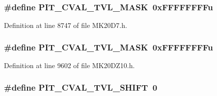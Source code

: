 \subsubsection[{\texorpdfstring{P\+I\+T\+\_\+\+C\+V\+A\+L\+\_\+\+T\+V\+L\+\_\+\+M\+A\+SK}{PIT_CVAL_TVL_MASK}}]{\setlength{\rightskip}{0pt plus 5cm}\#define P\+I\+T\+\_\+\+C\+V\+A\+L\+\_\+\+T\+V\+L\+\_\+\+M\+A\+SK~0x\+F\+F\+F\+F\+F\+F\+F\+Fu}\hypertarget{group___p_i_t___register___masks_ga2810b877338372cb9b9d944b206c08d3}{}\label{group___p_i_t___register___masks_ga2810b877338372cb9b9d944b206c08d3}


Definition at line 8747 of file M\+K20\+D7.\+h.

\subsubsection[{\texorpdfstring{P\+I\+T\+\_\+\+C\+V\+A\+L\+\_\+\+T\+V\+L\+\_\+\+M\+A\+SK}{PIT_CVAL_TVL_MASK}}]{\setlength{\rightskip}{0pt plus 5cm}\#define P\+I\+T\+\_\+\+C\+V\+A\+L\+\_\+\+T\+V\+L\+\_\+\+M\+A\+SK~0x\+F\+F\+F\+F\+F\+F\+F\+Fu}\hypertarget{group___p_i_t___register___masks_ga2810b877338372cb9b9d944b206c08d3}{}\label{group___p_i_t___register___masks_ga2810b877338372cb9b9d944b206c08d3}


Definition at line 9602 of file M\+K20\+D\+Z10.\+h.

\subsubsection[{\texorpdfstring{P\+I\+T\+\_\+\+C\+V\+A\+L\+\_\+\+T\+V\+L\+\_\+\+S\+H\+I\+FT}{PIT_CVAL_TVL_SHIFT}}]{\setlength{\rightskip}{0pt plus 5cm}\#define P\+I\+T\+\_\+\+C\+V\+A\+L\+\_\+\+T\+V\+L\+\_\+\+S\+H\+I\+FT~0}\hypertarget{group___p_i_t___register___masks_ga28753a1a45034ccd34e052faa3e02ff0}{}\label{group___p_i_t___register___masks_ga28753a1a45034ccd34e052faa3e02ff0}



